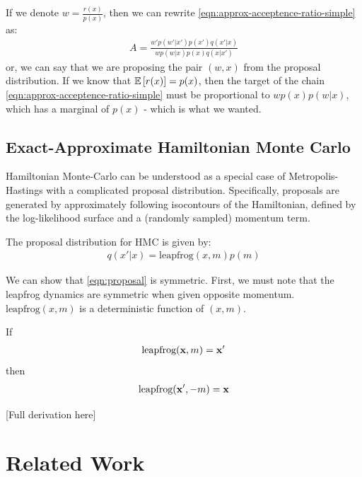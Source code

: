 \documentclass{article}
\begin{document}
If we denote $w = \frac{r(x)}{p(x)}$, then we can rewrite \eqref{eqn:approx-acceptence-ratio-simple} as:
%
\begin{align}
A = \frac{w' p(w' | x' ) p(x') q(x' | x )}{w p(w | x ) p(x) q(x | x' )}
\label{eqn:approx-acceptence-ratio-complex}
\end{align}
%
or, we can say that we are proposing the pair $(w,x)$ from the proposal distribution.
%
%
If we know that $\mathbb{E}\left[ r(x) \right] = p(x)$, then the target of the chain \eqref{eqn:approx-acceptence-ratio-simple} must be proportional to $w p(x) p(w|x)$, which has a marginal of $p(x)$ - which is what we wanted.

\subsection{Exact-Approximate Hamiltonian Monte Carlo}

Hamiltonian Monte-Carlo can be understood as a special case of Metropolis-Hastings with a complicated proposal distribution.  Specifically, proposals are generated by approximately following isocontours of the Hamiltonian, defined by the log-likelihood surface and a (randomly sampled) momentum term.

The proposal distribution for HMC is given by:
\begin{align}
q(x' | x) = \textrm{leapfrog}(x, m) p(m)
\label{eqn:proposal}
\end{align}

We can show that \eqref{eqn:proposal} is symmetric.  First, we must note that the leapfrog dynamics are symmetric when given opposite momentum.  $\textrm{leapfrog}(x, m)$ is a deterministic function of $(x,m)$.

If
\begin{align}
\textrm{leapfrog}({\bf{x}}, m) = {\bf{x}}'
\end{align}
then
\begin{align}
\textrm{leapfrog}({\bf{x}}', -m) = {\bf{x}}
\end{align}




[Full derivation here]

\section{Related Work}
\end{document}
